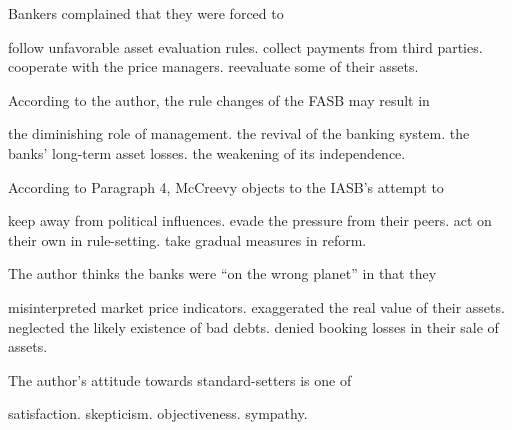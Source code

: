 \item Bankers complained that they were forced to
\begin{tasks}
	\task follow unfavorable asset evaluation rules.
	\task collect payments from third parties.
	\task cooperate with the price managers.
	\task reevaluate some of their assets.
\end{tasks}
\item According to the author, the rule changes of the FASB may result in
\begin{tasks}
	\task the diminishing role of management.
	\task the revival of the banking system.
	\task the banks' long-term asset losses.
	\task the weakening of its independence.
\end{tasks}
\item According to Paragraph 4, McCreevy objects to the IASB's attempt to
\begin{tasks}
	\task keep away from political influences.
	\task evade the pressure from their peers.
	\task act on their own in rule-setting.
	\task take gradual measures in reform.
\end{tasks}
\item The author thinks the banks were ``on the wrong planet'' in that they
\begin{tasks}
	\task misinterpreted market price indicators.
	\task exaggerated the real value of their assets.
	\task neglected the likely existence of bad debts.
	\task denied booking losses in their sale of assets.
\end{tasks}
\item The author's attitude towards standard-setters is one of
\begin{tasks}
	\task satisfaction.
	\task skepticism.
	\task objectiveness.
	\task sympathy.
\end{tasks}